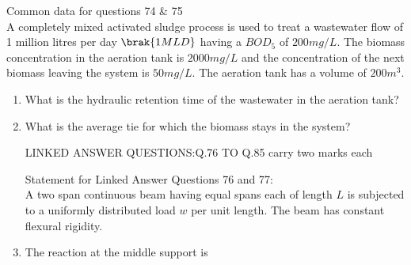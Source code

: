 Common data for questions 74 \& 75 \\
A completely mixed activated sludge process is used to treat a wastewater flow of 1 million litres per day $\brak{1 MLD}$ having a $BOD_5$ of $200 mg/L$. The biomass concentration in the aeration tank is $2000 mg/L$ and the concentration of the next biomass leaving the system is $50 mg/L$. The aeration tank has a volume of $200 m^3$.
\begin{enumerate}[start=74]
\item %
What is the hydraulic retention time of the wastewater in the aeration tank?
\begin{enumerate}
\end{enumerate}
\item %
What is the average tie for which the biomass stays in the system?
\begin{enumerate}
\end{enumerate}
\begin{center}
    LINKED ANSWER QUESTIONS:Q.76 TO Q.85 carry two marks each
\end{center} 
Statement for Linked Answer Questions 76 and 77:\\
A two span continuous beam having equal spans each of length $L$ is subjected  to a uniformly distributed load $w$ per unit length. The beam has constant flexural rigidity.
\item %
The reaction at the middle support is 
\begin{enumerate}
\end{enumerate}

\end{enumerate}
